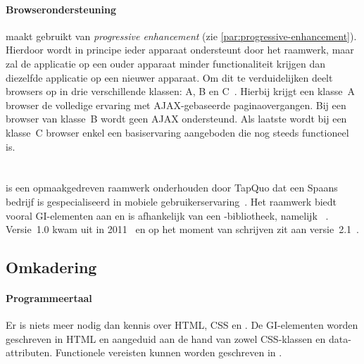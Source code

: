 \paragraph{Browserondersteuning}
\label{sec:jqm-browser-support}

\jqm{} maakt gebruikt van \emph{progressive enhancement} (zie \ref{par:progressive-enhancement}).
Hierdoor wordt in principe ieder apparaat ondersteunt door het raamwerk, maar zal de applicatie op een ouder apparaat minder functionaliteit krijgen dan diezelfde applicatie op een nieuwer apparaat.
Om dit te verduidelijken deelt \jqm{} browsers op in drie verschillende klassen: A, B en C~\cite{JQuery2012d}. 
Hierbij krijgt een klasse~A browser de volledige ervaring met AJAX-gebaseerde paginaovergangen.
Bij een browser van klasse~B wordt geen AJAX ondersteund.
Als laatste wordt bij een klasse~C browser enkel een basiservaring aangeboden die nog steeds functioneel is.


\section{\lungo}
\label{sec:raamwerk-lungo}
\lungo{} is een opmaakgedreven raamwerk onderhouden door TapQuo dat een Spaans bedrijf is gespecialiseerd in mobiele gebruikerservaring~\cite{TapQuo2013a}.
Het raamwerk biedt vooral GI-elementen aan en is afhankelijk van een \js{}-bibliotheek, namelijk \quo{}~\cite{TapQuo2013}.
Versie~1.0 kwam uit in 2011~\cite{TapQuo2011} en op het moment van schrijven zit \lungo{} aan versie~2.1~\cite{TapQuo2013}.

\subsection{Omkadering}
\paragraph{Programmeertaal}
Er is niets meer nodig dan kennis over HTML, CSS en \js{}.
De GI-elementen worden geschreven in HTML en aangeduid aan de hand van zowel CSS-klassen en data-attributen.
Functionele vereisten kunnen worden geschreven in \js{}.

